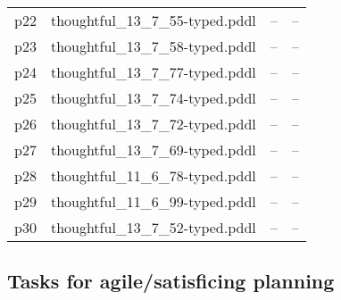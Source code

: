 \documentclass{article}
\begin{document}
\begin{center}
\begin{tabular}{@{}l|r|r|r@{}}
  p22& thoughtful\_13\_7\_55-typed.pddl&--&--\\
  p23& thoughtful\_13\_7\_58-typed.pddl&--&--\\
  p24& thoughtful\_13\_7\_77-typed.pddl&--&--\\
  p25& thoughtful\_13\_7\_74-typed.pddl&--&--\\
  p26& thoughtful\_13\_7\_72-typed.pddl&--&--\\
  p27& thoughtful\_13\_7\_69-typed.pddl&--&--\\
  p28& thoughtful\_11\_6\_78-typed.pddl&--&--\\
  p29& thoughtful\_11\_6\_99-typed.pddl&--&--\\
  p30& thoughtful\_13\_7\_52-typed.pddl&--&--
                            \end{tabular}
                            \end{center}
                    

                    \subsection*{Tasks for agile/satisficing planning}
                    
\end{document}
